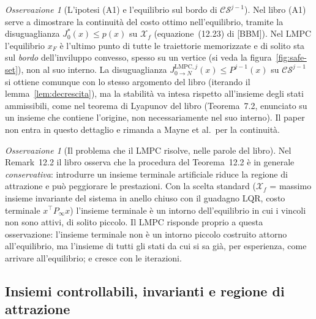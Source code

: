 \documentclass[11pt,a4paper]{article}
\theoremstyle{definition}
\theoremstyle{plain}
\theoremstyle{remark}
\newtheorem{osservazione}[definizione]{Osservazione}
\newcommand{\Xf}{\mathcal{X}_f}
\newcommand{\CS}{\mathcal{CS}}
\newcommand{\JL}{J^{\mathrm{LMPC},j}_{0\to N}}
\begin{document}
\begin{osservazione}[L'ipotesi (A1) e l'equilibrio sul bordo di $\CS^{j-1}$]
Nel libro (A1) serve a dimostrare la continuità del costo ottimo
nell'equilibrio, tramite la disuguaglianza $J^*_0(x)\le p(x)$ su $\Xf$
(equazione~(12.23) di [BBM]). Nel LMPC l'equilibrio $x_F$ è l'ultimo punto di
tutte le traiettorie memorizzate e di solito sta sul \emph{bordo}
dell'inviluppo convesso, spesso su un vertice (si veda la
figura~\ref{fig:safe-set}), non al suo interno. La disuguaglianza
$\JL(x)\le P^{j-1}(x)$ su $\CS^{j-1}$ si ottiene comunque con lo stesso
argomento del libro (iterando il lemma~\ref{lem:decrescita}), ma la stabilità
va intesa rispetto all'insieme degli stati ammissibili, come nel teorema di
Lyapunov del libro (Teorema~7.2, enunciato su un insieme che contiene
l'origine, non necessariamente nel suo interno). Il paper non entra in questo
dettaglio e rimanda a Mayne et al.\ per la continuità.
\end{osservazione}

\begin{osservazione}[Il problema che il LMPC risolve, nelle parole del libro]
Nel Remark~12.2 il libro osserva che la procedura del Teorema~12.2 è in
generale \emph{conservativa}: introdurre un insieme terminale artificiale
riduce la regione di attrazione e può peggiorare le prestazioni. Con la
scelta standard ($\Xf$ = massimo insieme invariante del sistema in anello
chiuso con il guadagno LQR, costo terminale $x^\top P_\infty x$) l'insieme
terminale è un intorno dell'equilibrio in cui i vincoli non sono attivi, di
solito piccolo. Il LMPC risponde proprio a questa osservazione: l'insieme
terminale non è un intorno piccolo costruito attorno all'equilibrio, ma
l'insieme di tutti gli stati da cui si sa già, per esperienza, come arrivare
all'equilibrio; e cresce con le iterazioni.
\end{osservazione}

\subsection{Insiemi controllabili, invarianti e regione di attrazione}\label{sec:libro-insiemi}
\end{document}
